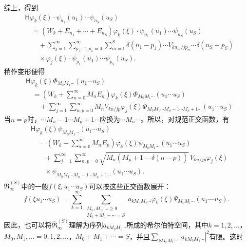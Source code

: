 \documentclass[fontsize=13pt,twoside,openany,headings=normal,parskip=false,bookmarkpackage=false,DIV=calc]{scrbook}
\begin{document}
综上，得到
\begin{align*}
 &\mathsf{H}\varphi_k(\xi)\cdot\psi_{n_1}(u_1)\cdots\psi_{n_S}(u_S)\\
 &\quad=(W_k+E_{n_1}+\cdots+E_{n_S})\varphi_k(\xi)\cdot\psi_{n_1}(u_1)\cdots\psi_{n_S}(u_S)\\
 &\qquad{}+\sum_{j=1}^{\infty}\sum_{p_1,\ldots,p_S=0}^{\infty}\sum_{m=1}^{S}
 \delta(n_1-p_1)\cdots V_{kn_m/jp_m}\cdots\delta(n_S-p_S)\\
 &\qquad{}\times\varphi_j(\xi)\cdot\psi_{p_1}(u_1)\cdots\psi_{p_S}(u_S).
\end{align*}
稍作变形便得
\begin{align*}
 &\mathsf{H}\varphi_k(\xi)\Phi_{M_0M_1\cdots}(u_1\cdots u_S)\\
 &\quad=\left(W_k+\sum_{n=0}^{\infty}M_nE_n\right)\varphi_k(\xi)\Phi_{M_0M_1\cdots}(u_1\cdots u_S)\\
 &\qquad{}+\sum_{j=1}^{\infty}\sum_{n,p=0}^{\infty}M_nV_{kn/jp}\varphi_j(\xi)
 \Phi_{M_0M_1\cdots M_n-1\cdots M_p+1\cdots}(u_1\cdots u_S)
\end{align*}
当$n=p$时，$\cdots M_n-1\cdots M_p+1\cdots$应换为$\cdots M_n\cdots$。所以，对规范正交函数，有
\begin{align*}
 &\mathsf{H}\varphi_k(\xi)\psi_{M_0M_1\cdots}(u_1\cdots u_S)\\
 &\quad=\left(W_k+\sum_{n=0}^{\infty}M_nE_n\right)\varphi_k(\xi)\psi_{M_0M_1\cdots}(u_1\cdots u_S)\\
 &\qquad{}+\sum_{j=1}^{\infty}\sum_{n,p=0}^{\infty}\sqrt{M_n(M_p+1-\delta(n-p))}\,V_{kn/jp}\varphi_j(\xi)\\
 &\qquad{}\times\psi_{M_0M_1\cdots M_n-1\cdots M_p+1\cdots}(u_1\cdots u_S).
\end{align*}
$\overline{\mathfrak R}_{\infty}^{(S)}$中的一般$f(\xi,\allowbreak u_1\cdots u_S)$可以按这些正交函数\hypertarget{origpage-149}{}\label{origpage-149}展开：
\[
 f(\xi u_1\cdots u_S)=\sum_{k=1}^{\infty}
 \sum_{\substack{M_0,M_1,\ldots\ge0\\M_0+M_1+\cdots=S}}
 a_{kM_0M_1\cdots}\varphi_k(\xi)\Psi_{M_0M_1\cdots}(u_1\text{---}u_S).
\]
因此，也可以将$\overline{\mathfrak R}_{\infty}^{(S)}$理解为序列$a_{kM_0M_1\cdots}$所成的希尔伯特空间，其中$k=1,\allowbreak 2,\allowbreak \ldots$，$M_0,\allowbreak M_1,\allowbreak \ldots=0,\allowbreak 1,\allowbreak 2,\allowbreak \ldots$，$M_0+M_1+\cdots=S$，并且$\sum_{kM_0M_1\cdots}|a_{kM_0M_1\cdots}|^2$有限。这时
\end{document}
